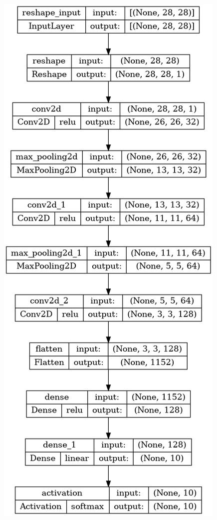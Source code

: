 \begin{figure}[!ht]
    \centering
    \begin{minipage}{0.5\textwidth}
        \centering
        \includegraphics[width=\linewidth]{obrazky-figures/model-plots/Image_CNNx.png} %

\end{minipage}
\end{figure}
